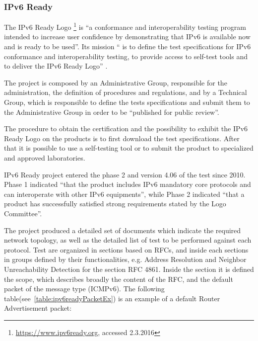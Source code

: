 \documentclass[12pt]{article}
\begin{document}
\subsubsection{IPv6 Ready}
\label{subsub:ipv6Ready}

The IPv6 Ready Logo \footnote{\url{https://www.ipv6ready.org}, accessed 2.3.2016} is ``a conformance and interoperability testing program intended to increase user confidence by demonstrating that IPv6 is available now and is ready to be used''. Its mission `` is to define the test specifications for IPv6 conformance and interoperability testing, to provide access to self-test tools and to deliver the IPv6 Ready Logo'' \cite{ipv6ready}.

The project is composed by an Administrative Group, responsible for the administration, the definition of procedures and regulations, and by a Technical Group, which is responsible to define the tests specifications and submit them to the Administrative Group in order to be ``published for public review''.

The procedure to obtain the certification and the possibility to exhibit the IPv6 Ready Logo on the products is to first download the test specifications. After that it is possible to use a self-testing tool or to submit the product to specialized and approved laboratories.

IPv6 Ready project entered the phase 2 and version 4.06 of the test since 2010. Phase 1 indicated ``that the product includes IPv6 mandatory core protocols and can interoperate with other IPv6 equipments'', while Phase 2 indicated ``that a product has successfully satisfied strong requirements stated by the Logo Committee''.

The project produced a detailed set of documents\cite{ipv6readyCore}\cite{ipv6readyCore2} which indicate the required network topology, as well as the detailed list of test to be performed against each protocol. Test are organized in sections based on RFCs, and inside each sections in groups defined by their functionalities, e.g. Address Resolution and Neighbor Unreachability Detection for the section RFC 4861. Inside the section it is defined the scope, which describes broadly the content of the RFC, and the default packet of the message type (ICMPv6). The following table(see~\ref{table:ipv6readyPacketEx}) is an example of a default Router Advertisement packet:
\end{document}
